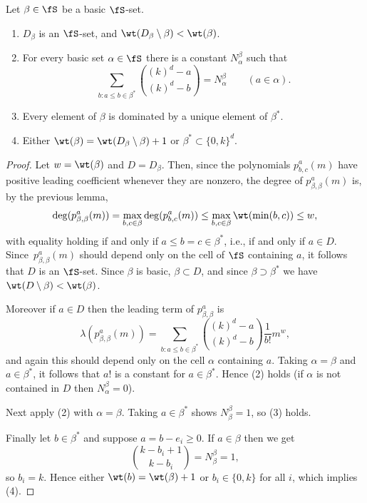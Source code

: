 \begin{prop}\label{key-prop}
    Let $\beta \in \fS$ be a basic $\fS$-set.
    \begin{enumerate}
        \item $D_\beta$ is an $\fS$-set, and $\wt(D_\beta \setminus \beta) < \wt(\beta)$.
        \item For every basic set $\alpha \in \fS$ there is a constant $N^\beta_\alpha$ such that
        \[
            \sum_{b : a \leq b \in \beta^*} \binom{(k)^d - a}{(k)^d - b} = N^\beta_\alpha \qquad (a \in \alpha).
        \]
        \item Every element of $\beta$ is dominated by a unique element of $\beta^*$.
        \item Either $\wt(\beta) = \wt(D_\beta \setminus \beta) + 1$ or $\beta^* \subset \{0, k\}^d$.
    \end{enumerate}
\end{prop}
\begin{proof}
    Let $w = \wt(\beta)$ and $D = D_\beta$.
    Then, since the polynomials $p^a_{b,c}(m)$ have positive leading coefficient whenever they are nonzero,
    the degree of $p^a_{\beta,\beta}(m)$ is, by the previous lemma,
    \[
        \deg(p^a_{\beta,\beta}(m)) = \max_{b, c \in \beta} \deg(p^a_{b,c}(m)) \le \max_{b, c \in \beta} \wt(\min(b, c)) \le w,
    \]
    with equality holding if and only if $a \leq b = c \in \beta^*$, i.e., if and only if $a \in D$.
    Since~$p^a_{\beta,\beta}(m)$ should depend only on the cell of $\fS$ containing $a$,
    it follows that $D$ is an $\fS$-set.
    Since $\beta$ is basic, $\beta \subset D$, and since $\beta \supset \beta^*$ we have $\wt(D \setminus \beta) < \wt(\beta)$.
    
    Moreover if $a \in D$ then the leading term of $p^a_{\beta,\beta}$ is
    \[
        \lambda(p^a_{\beta,\beta}(m)) = \sum_{b : a \leq b \in \beta^*} \binom{(k)^d - a}{(k)^d - b} \frac1{b!} m^w,
    \]
    and again this should depend only on the cell $\alpha$ containing $a$.
    {Taking $\alpha = \beta$ and $a\in \beta^*$, it follows that $a!$ is a constant for $a \in \beta^*$.}
    Hence (2) holds (if $\alpha$ is not contained in $D$ then $N^\beta_\alpha = 0$).
    
    Next apply (2) with $\alpha = \beta$.
    Taking $a \in \beta^*$ shows $N^\beta_\beta = 1$, so (3) holds.
    
    Finally let $b \in \beta^*$ and suppose $a = b - e_i \ge 0$.
    If $a \in \beta$ then we get
    \[
        \binom{k-b_i+1}{k-b_i} = N^\beta_\beta = 1,
    \]
    so $b_i = k$.
    Hence either $\wt(b) = \wt(\beta)+1$ or $b_i \in \{0, k\}$ for all $i$, which implies (4).
\end{proof}

